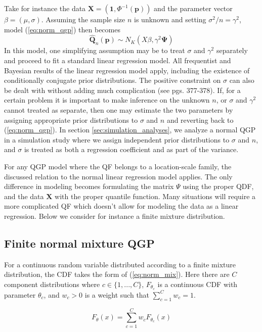 Take for instance the data 
$\boldsymbol{X} = \left(\textbf{1}, \Phi^{-1}(\boldsymbol{p})\right)$ and the 
parameter vector $\beta = (\mu, \sigma)$. Assuming the sample size $n$ is 
unknown and setting $\sigma^2/n = \gamma^2$, model (\ref{eq:norm_qgp}) then 
becomes
\[
    \hat{\boldsymbol{Q}}_n(\boldsymbol{p}) \sim N_K\left(X\beta, 
\gamma^2 \boldsymbol{\Psi}\right)
\]
In this model, one simplifying assumption may be to treat $\sigma$ and 
$\gamma^2$ separately and proceed to fit a standard linear regression model. 
All frequentist and Bayesian results of the linear regression model apply, 
including the existence of conditionally conjugate prior distributions. The 
positive constraint on $\sigma$ can also be dealt with without adding much 
complication (see \cite{gelman2013bayesian} pgs. 377-378). 
If, for a certain problem it is important to make inference on the unknown $n$, or $\sigma$ and 
$\gamma^2$ cannot treated as separate, then one may estimate the two parameters 
by assigning appropriate prior distributions to $\sigma$ and $n$ and reverting 
back to (\ref{eq:norm_qgp}). In section \ref{sec:simulation_analyses}, we 
analyze a normal QGP in a simulation study where we assign independent prior 
distributions to $\sigma$ and $n$, and $\sigma$ is treated as both a regression 
coefficient and as part of the variance.



For any QGP model where the QF belongs to a location-scale family, the 
discussed relation to the normal linear regression model applies. The only 
difference in modeling becomes formulating the matrix $\Psi$ using the proper 
QDF, and the data $\boldsymbol{X}$ with the proper quantile function. Many 
situations will require a more complicated QF which doesn't allow for modeling 
the data as a linear regression. Below we consider for instance a finite 
mixture distribution. 

\subsection{Finite normal mixture QGP}

For a continuous random variable distributed according to a finite mixture 
distribution, the CDF takes the form of (\ref{eq:norm_mix}). Here there are $C$ 
component distributions where $c \in \{1, ..., C\}$, $F_{\theta_c}$ is a 
continuous CDF with parameter $\theta_c$, and $w_c > 0$ is a weight such that 
$\sum_{c = 1}^C w_c = 1$. 

\begin{equation}
    \label{eq:norm_mix}
    F_{\theta}(x) = \sum_{c = 1}^C w_c F_{\theta_c}(x)
\end{equation}

